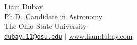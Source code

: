 \documentclass[12pt]{article}
\begin{document}
\thispagestyle{plain} %

\begin{center}
    {\huge Liam Dubay} \\
    \vspace{8pt}
    {\Large Ph.D.\ Candidate in Astronomy\\The Ohio State University} \\
    \vspace{6pt}
    {\large \href{mailto:dubay.11@osu.edu}{\texttt{dubay.11@osu.edu}} $\vert$ \url{www.liamdubay.com}}

\end{center}

\vspace{-18pt}


\vspace{-6pt}


% 

% 

\vspace{-6pt}





% 

\vspace{-24pt}


\vspace{-12pt}





\end{document}
